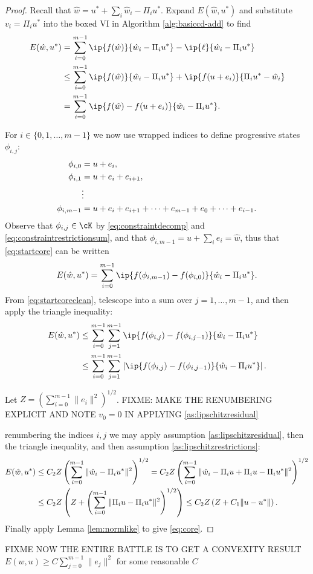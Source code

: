 \begin{proof}  Recall that $\hat w = u^* + \sum_i \hat w_i - \Pi_i u^*$.  Expand $E(\hat w,u^*)$ and substitute $v_i = \Pi_i u^*$ into the boxed VI in Algorithm \ref{alg:basiccd-add} to find
\begin{align}
E(\hat w,u^*) &= \sum_{i=0}^{m-1} \ip{f(\hat w)}{\hat w_i - \Pi_i u^*} - \ip{\ell}{\hat w_i - \Pi_i u^*} \notag \\
    &\le \sum_{i=0}^{m-1} \ip{f(\hat w)}{\hat w_i - \Pi_i u^*} + \ip{f(u + e_i)}{\Pi_i u^* - \hat w_i} \notag \\
    &= \sum_{i=0}^{m-1} \ip{f(\hat w) - f(u + e_i)}{\hat w_i - \Pi_i u^*}. \label{eq:startcore}
\end{align}

For $i\in \{0,1,\dots,m-1\}$ we now use wrapped indices to define progressive states $\phi_{i,j}$:
\begin{align}
\phi_{i,0} &= u + e_i, \label{eq:gridcore} \\
\phi_{i,1} &= u + e_i + e_{i+1}, \notag \\
  &\vdots \notag \\
\phi_{i,m-1} &= u + e_i + e_{i+1} + \dots + e_{m-1} + e_0 + \dots + e_{i-1}. \notag
\end{align}
Observe that $\phi_{i,j} \in \cK$ by \eqref{eq:constraintdecomp} and \eqref{eq:constraintrestrictionsum}, and that $\phi_{i,m-1} = u + \sum_i e_i = \hat w$, thus that \eqref{eq:startcore} can be written
\begin{equation}
E(\hat w,u^*) = \sum_{i=0}^{m-1} \ip{f(\phi_{i,m-1}) - f(\phi_{i,0})}{\hat w_i - \Pi_i u^*}. \label{eq:startcoreclean}
\end{equation}
From \eqref{eq:startcoreclean}, telescope into a sum over $j=1,\dots,m-1$, and then apply the triangle inequality:
\begin{align}
E(\hat w,u^*) &\le \sum_{i=0}^{m-1} \sum_{j=1}^{m-1} \ip{f(\phi_{i,j}) - f(\phi_{i,j-1})}{\hat w_i - \Pi_i u^*} \label{eq:nextcore} \\
  &\le \sum_{i=0}^{m-1} \sum_{j=1}^{m-1} \left|\ip{f(\phi_{i,j}) - f(\phi_{i,j-1})}{\hat w_i - \Pi_i u^*}\right|. \notag
\end{align}

Let $Z=\left(\sum_{i=0}^{m-1} \|e_i\|^2\right)^{1/2}$.  FIXME: MAKE THE RENUMBERING EXPLICIT AND NOTE $v_0=0$ IN APPLYING \eqref{as:lipschitzresidual}

renumbering the indices $i,j$ we may apply assumption \eqref{as:lipschitzresidual}, then the triangle inequality, and then assumption \eqref{as:lipschitzrestrictions}:
\begin{align}
E(\hat w,u^*) &\le C_2 Z \left(\sum_{i=0}^{m-1} \|\hat w_i - \Pi_i u^*\|^2\right)^{1/2} = C_2 Z \left(\sum_{i=0}^{m-1} \|\hat w_i - \Pi_i u + \Pi_i u - \Pi_i u^*\|^2\right)^{1/2} \label{eq:nextnextcore} \\
  &\le C_2 Z \left(Z + \left(\sum_{i=0}^{m-1} \|\Pi_i u - \Pi_i u^*\|^2\right)^{1/2}\right) \le C_2 Z \left(Z + C_1 \|u-u^*\|\right). \notag
\end{align}
Finally apply Lemma \ref{lem:normlike} to give \eqref{eq:core}.
\end{proof}

FIXME NOW THE ENTIRE BATTLE IS TO GET A CONVEXITY RESULT $E(w,u) \ge C \sum_{j=0}^{m-1} \|e_j\|^2$ for some reasonable $C$
